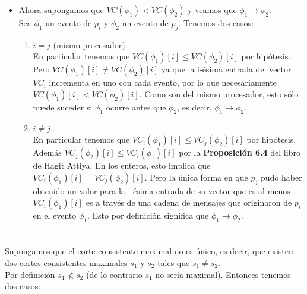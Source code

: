 \documentclass{article}
\begin{document}
\begin{itemize}
    \item Ahora supongamos que $VC(\phi_1) < VC(\phi_2)$ y veamos que $\phi_1 \rightarrow \phi_2$. \\
    Sea $\phi_1$ un evento de $p_i$ y $\phi_2$ un evento de $p_j$. Tenemos dos casos:
    \begin{enumerate}
        \item $i = j$ (mismo procesador). \\
        En particular tenemos que $VC(\phi_1)[i] \leq VC(\phi_2)[i]$ por hipótesis. Pero $VC(\phi_1)[i] \not= VC(\phi_2)[i]$ ya que la i-ésima entrada del vector $VC_i$ incrementa en uno con cada evento, por lo que necesariamente $VC(\phi_1)[i] < VC(\phi_2)[i]$. Como son del mismo procesador, esto sólo puede suceder si $\phi_1$ ocurre antes que $\phi_2$, es decir, $\phi_1 \rightarrow \phi_2$.
        \item $i \not= j$. \\
        En particular tenemos que $VC_i(\phi_1)[i] \leq VC_j(\phi_2)[i]$ por hipótesis. Además $VC_j(\phi_2)[i] \leq VC_i(\phi_1)[i]$ por la \textbf{Proposición 6.4} del libro de Hagit Attiya. En los enteros, esto implica que $VC_i(\phi_1)[i] = VC_j(\phi_2)[i]$. Pero la única forma en que $p_j$ pudo haber obtenido un valor para la i-ésima entrada de su vector que es al menos $VC_i(\phi_1)[i]$ es a través de una cadena de mensajes que originaron de $p_i$ en el evento $\phi_1$. Esto por definición significa que $\phi_1 \rightarrow \phi_2$.
    \end{enumerate}
    
\end{itemize}

\section{}

Supongamos que el corte consistente maximal no es único, es decir, que existen dos cortes consistentes maximales $s_1$ y $s_2$ tales que $s_1 \not= s_2$. \\
Por definición $s_1 \not< s_2$ (de lo contrario $s_1$ no sería maximal). Entonces tenemos dos casos:
\end{document}
